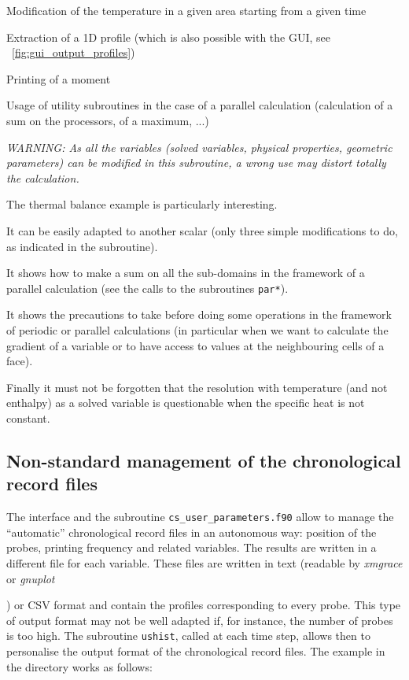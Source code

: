 {{{\begin{list}{-}{}
\item Modification of the temperature in a given area starting from a
      given time

\item Extraction of a 1D profile (which is also possible with the GUI,
see \figurename~\ref{fig:gui_output_profiles})

\item Printing of a moment

\item Usage of utility
      subroutines in the case of a parallel calculation
      (calculation of a sum on the processors, of a maximum, ...)
\end{list}

{\em WARNING: As all the variables (solved variables, physical
properties, geometric parameters) can be modified in this subroutine, a
wrong use may distort totally the calculation.}

The thermal balance example is particularly interesting.
\begin{list}{-}{}
\item It can be easily adapted to another scalar (only three simple
      modifications to do, as indicated in the subroutine).
\item It shows how to make a sum on all the sub-domains in the framework
      of a parallel calculation (see the calls to the subroutines
      \texttt{par*}).
\item It shows the precautions to take before doing some operations in
      the framework of periodic or parallel calculations (in particular
      when we want to calculate the gradient of a variable or to have
      access to values at the neighbouring cells of a face).
\item Finally it must not be forgotten that the resolution with
      temperature (and not enthalpy) as a solved variable is questionable when the specific
      heat is not constant.
\end{list}

\subsection{Non-standard management of the chronological record files}
\label{sec:prg_ushist}

The interface and the subroutine \texttt{cs\_user\_parameters.f90} allow to manage the
``automatic'' chronological record files in an autonomous way:
position of the probes, printing frequency and related variables. The
results are written in a different file for each variable. These files
are written in text (readable by {\em xmgrace} or {\em gnuplot}}) or CSV format and contain the profiles corresponding to
every probe. This type of output format may not be well adapted if, for
instance, the number of probes is too high. The subroutine
\texttt{ushist}, called at each time step, allows then to personalise the output format of the
chronological record files. The example in the
directory works as follows:

}}
